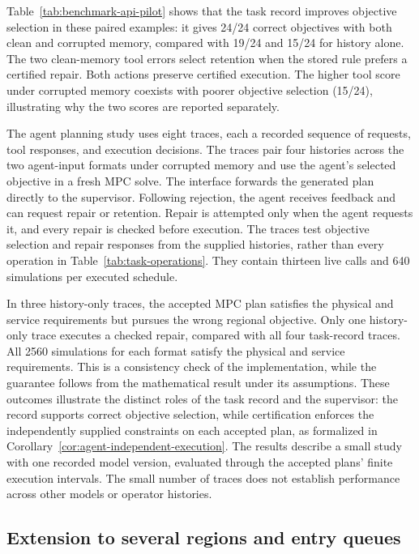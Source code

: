 Table~\ref{tab:benchmark-api-pilot} shows that the task record improves
objective selection in these paired examples: it gives 24/24 correct
objectives with both clean and corrupted memory, compared with 19/24 and
15/24 for history alone. The two clean-memory tool errors select
retention when the stored rule prefers a certified repair. Both actions
preserve certified execution. The higher tool score under corrupted
memory coexists with poorer objective selection (15/24), illustrating
why the two scores are reported separately.

The agent planning study uses eight
traces, each a recorded sequence of requests, tool responses, and execution
decisions. The traces pair four histories across the two agent-input formats under
corrupted memory and use the agent's selected objective in a fresh MPC
solve. The interface forwards the generated plan directly to the
supervisor. Following rejection, the agent receives feedback and can request
repair or retention. Repair is attempted only when the agent requests it,
and every repair is checked before execution. The traces test objective
selection and repair responses from the supplied histories, rather than
every operation in Table~\ref{tab:task-operations}.
They contain thirteen live calls and 640 simulations per executed schedule.

In three history-only traces, the accepted MPC plan satisfies the physical
and service requirements but pursues the wrong regional objective.
Only one history-only trace executes a checked repair, compared with
all four task-record traces. All 2560 simulations for each format satisfy
the physical and service requirements. This is a consistency check of
the implementation, while the guarantee follows from the mathematical
result under its assumptions. These outcomes illustrate the distinct
roles of the task record and the supervisor: the record supports correct
objective selection, while certification enforces the independently
supplied constraints on each accepted plan, as formalized in
Corollary~\ref{cor:agent-independent-execution}. The results describe a small
study with one recorded model version, evaluated through the accepted
plans' finite execution intervals. The small number of traces does not
establish performance across other models or operator histories.

\subsection{Extension to several regions and entry queues}
\label{sec:network-transfer-results}

